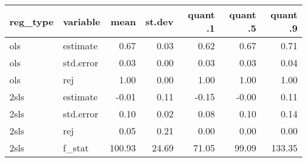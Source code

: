 \begin{tabular}{llrrrrr}
  \hline
reg\_type & variable & mean & st.dev & quant .1 & quant .5 & quant .9 \\ 
  \hline
ols & estimate & 0.67 & 0.03 & 0.62 & 0.67 & 0.71 \\ 
  ols & std.error & 0.03 & 0.00 & 0.03 & 0.03 & 0.04 \\ 
  ols & rej & 1.00 & 0.00 & 1.00 & 1.00 & 1.00 \\ 
  2sls & estimate & -0.01 & 0.11 & -0.15 & -0.00 & 0.11 \\ 
  2sls & std.error & 0.10 & 0.02 & 0.08 & 0.10 & 0.14 \\ 
  2sls & rej & 0.05 & 0.21 & 0.00 & 0.00 & 0.00 \\ 
  2sls & f\_stat & 100.93 & 24.69 & 71.05 & 99.09 & 133.35 \\ 
   \hline
\end{tabular}
